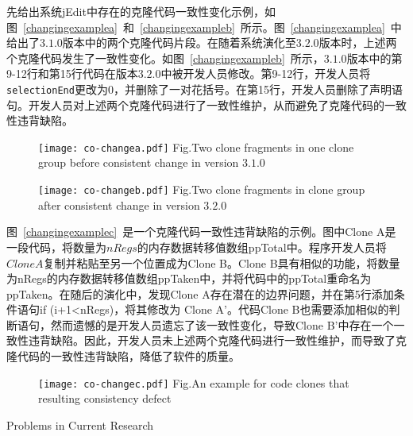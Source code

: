 先给出系统jEdit中存在的克隆代码一致性变化示例，如图~\ref{changingexamplea}~和~\ref{changingexampleb}~所示。图~\ref{changingexamplea}~中给出了$ 3.1.0 $版本中的两个克隆代码片段。在随着系统演化至$ 3.2.0 $版本时，上述两个克隆代码发生了一致性变化。如图~\ref{changingexampleb}~所示，$ 3.1.0 $版本中的第9-12行和第15行代码在版本$ 3.2.0$中被开发人员修改。第9-12行，开发人员将{\tt selectionEnd}更改为$0$，并删除了一对花括号。在第15行，开发人员删除了声明语句。开发人员对上述两个克隆代码进行了一致性维护，从而避免了克隆代码的一致性违背缺陷。

\begin{figure}[htbp]
\centering
\texttt{[image: co-changea.pdf]}
{Fig.$\!$}{Two clone fragments in one clone group before consistent change in version $3.1.0$}
\vspace{-1em}
\end{figure}

\begin{figure}[htbp]
\centering
\texttt{[image: co-changeb.pdf]}
{Fig.$\!$}{Two clone fragments in clone group after consistent change in version $3.2.0$}
\vspace{-1em}
\end{figure}

图~\ref{changingexamplec}~是一个克隆代码一致性违背缺陷的示例。图中Clone A是一段代码，将数量为$nRegs$的内存数据转移值数组{ppTotal}中。程序开发人员将$Clone A$复制并粘贴至另一个位置成为Clone B。Clone B具有相似的功能，将数量为{nRegs}的内存数据转移值数组{ppTaken}中，并将代码中的{ppTotal}重命名为{ppTaken}。在随后的演化中，发现Clone A存在潜在的边界问题，并在第5行添加条件语句{if (i+1<nRegs)}，将其修改为 Clone A’。代码Clone B也需要添加相似的判断语句，然而遗憾的是开发人员遗忘了该一致性变化，导致Clone B’中存在一个一致性违背缺陷。因此，开发人员未上述两个克隆代码进行一致性维护，而导致了克隆代码的一致性违背缺陷，降低了软件的质量。

\begin{figure}[htbp]
\centering
\texttt{[image: co-changec.pdf]}
{Fig.$\!$}{An example for code clones that resulting consistency defect\cite{nguyen2012clone}}
\vspace{-1em}
\end{figure}

{Problems in Current Research}


